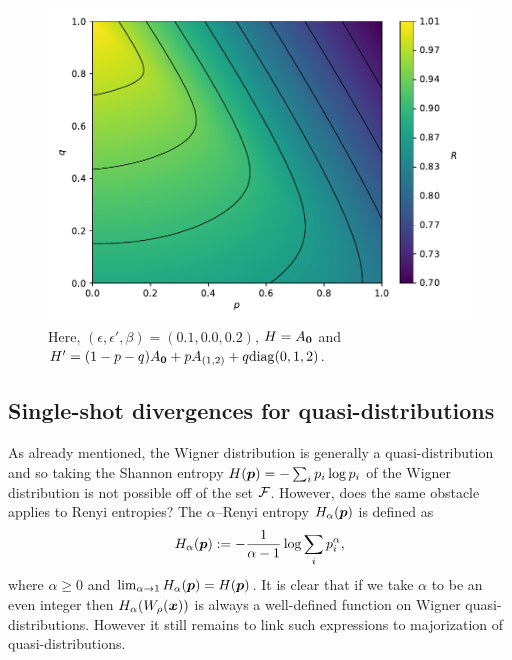 \documentclass[pra,
aps,
twocolumn,
superscriptaddress,
groupedaddress,
nofootinbib,
reprint
]{revtex4-1}
\begin{document}
\begin{figure}
    \centering
    \includegraphics[scale=0.4]{figs/test/R_vs_A.pdf}
    \caption{Here, $(\epsilon, \epsilon', \beta) = (0.1, 0.0, 0.2)$, $H = A_{\bm{0}}$ and $H' = (1-p-q)A_{\bm{0}}+pA_{(1,2)}+q{\rm{diag}}(0,1,2)$.
    }
    \label{fig:rvsa}
\end{figure}

\newpage
\subsection{Single-shot divergences for quasi-distributions}
As already mentioned, the Wigner distribution is generally a quasi-distribution and so taking the Shannon entropy $H(\boldsymbol{p}) = -\sum_i p_i \log p_i$ of the Wigner distribution is not possible off of the set ${\mathcal F}$. However, does the same obstacle applies to Renyi entropies? The $\alpha$--Renyi entropy $H_\alpha(\boldsymbol{p})$ is defined as
\begin{equation}
H_\alpha(\boldsymbol{p}) := -\frac{1}{\alpha -1} \log \sum_i p_i^\alpha,
\end{equation}
where $\alpha \ge 0$ and $\lim_{\alpha \rightarrow 1} H_\alpha(\boldsymbol{p}) = H(\boldsymbol{p})$. It is clear that if we take $\alpha$ to be an even integer then $H_\alpha (W_\rho(\boldsymbol{x}))$ is always a well-defined function on Wigner quasi-distributions. However it still remains to link such expressions to majorization of quasi-distributions.
 
\end{document}
